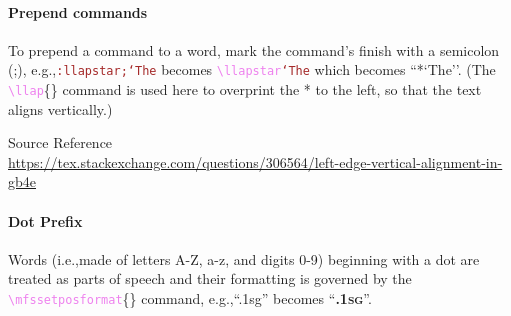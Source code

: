 \documentclass{article}
\newcommand\surl[1]{{\footnotesize\noindent Source Reference}\\\url{#1}}
\newcommand\para[1]{\bigskip\bigskip\paragraph{#1}}
\newcommand\glcmd[1]{\textcolor{violet}{\texttt{\textbackslash#1}}}
\newcommand\glcmdb[1]{\glcmd{#1}\{\}}
\newcommand\glmeta[1]{\textcolor{brown}{\texttt{#1}}}
\newcommand\eg{e.g.,\space}
\newcommand\ie{i.e.,\space}
\begin{document}





\para{Prepend commands} To prepend a command to a word, mark the command's finish with a semicolon (;), \eg \glmeta{:llapstar;`The} becomes \glcmd{llapstar}\glmeta{`The} which becomes ``*`The''. (The \glcmdb{llap} command is used here to overprint the * to the left, so that the text aligns vertically.)

\begin{exe}
\ex
{}
\end{exe}

\surl{https://tex.stackexchange.com/questions/306564/left-edge-vertical-alignment-in-gb4e}

\para{Dot Prefix} Words (\ie made of letters A-Z, a-z, and digits 0-9) beginning with a dot are treated as parts of speech and their formatting is governed by the \glcmdb{mfssetposformat} command, \eg ``.1sg'' becomes ``{\scshape\bfseries\sffamily .1sg}''.

\mfssetposformat{\scshape\bfseries\sffamily}
\begin{exe}
    \ex 
%

\end{exe}
\end{document}
